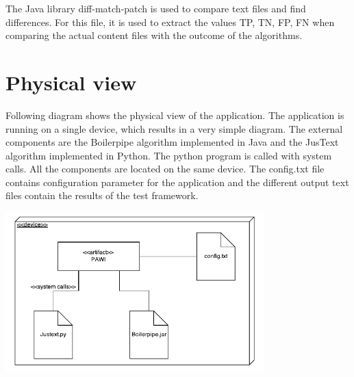 The Java library diff-match-patch \cite{google:diffMatchPatch} is used to compare text files and find differences. For this file, it is used to extract the values TP, TN, FP, FN when comparing the actual content files with the outcome of the algorithms.


\section{Physical view}

Following diagram shows the physical view of the application. The application is running on a single device, which results in a very simple diagram. The external components are the Boilerpipe algorithm implemented in Java and the JusText algorithm implemented in Python. The python program is called with system calls. All the components are located on the same device. 
The config.txt file contains configuration parameter for the application and the different output text files contain the results of the test framework.

\includegraphics[width=10cm]{Figures/deploymentDiagram.pdf}


